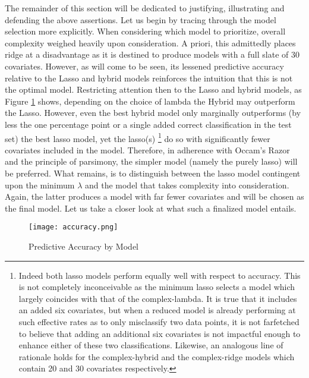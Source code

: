 \documentclass[11pt]{article}
\begin{document}
	The remainder of this section will be dedicated to justifying, illustrating and defending the above assertions.  Let us begin by tracing through the model selection more explicitly.  When considering which model to prioritize, overall complexity weighed heavily upon consideration.  A priori, this admittedly places ridge at a disadvantage as it is destined to produce models with a full slate of 30 covariates.  However, as will come to be seen, its lessened predictive accuracy relative to the Lasso and hybrid models reinforces the intuition that this is not the optimal model.  Restricting attention then to the Lasso and hybrid models, as Figure \ref{fig:acc} shows, depending on the choice of lambda the Hybrid may outperform the Lasso.  However, even the best hybrid model only marginally outperforms (by less the one percentage point or a single added correct classification in the test set) the best lasso model, yet the lasso(s) \footnote{Indeed both lasso models perform equally well with respect to accuracy.  This is not completely inconceivable as the minimum lasso selects a model which largely coincides  with that of the complex-lambda.  It is true that it includes an added six covariates, but when a reduced model is already performing at such effective rates as to only misclassify two data points, it is not farfetched to believe that adding an additional six covariates is not impactful enough to enhance either of these two classifications.  Likewise, an analogous line of rationale holds for the complex-hybrid and the complex-ridge models which contain 20 and 30 covariates respectively. } do so with significantly fewer covariates included in the model.   Therefore, in adherence with Occam's Razor and the principle of parsimony, the simpler model (namely the purely lasso) will be preferred.  What remains, is to distinguish between the lasso model contingent upon the minimum $\lambda$ and the model that takes complexity into consideration.  Again, the latter produces a model with far fewer covariates and will be chosen as the final model.  Let us take a closer look at what such a finalized model entails.    
	
	\begin{figure}[htbp]
\centerline{\texttt{[image: accuracy.png]}}
\caption{Predictive Accuracy by Model}\label{fig:acc}
\end{figure}
		
\end{document}
